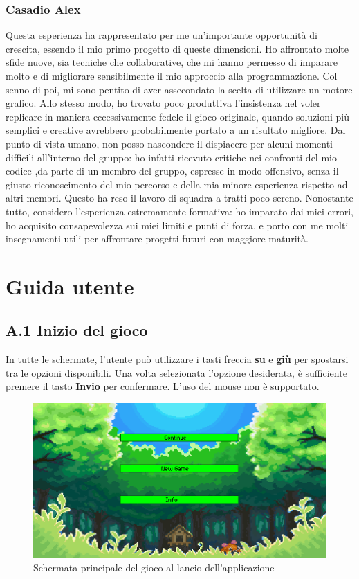 \documentclass[a4paper,12pt]{report}
\begin{document}
{{\subsection{Casadio Alex}
Questa esperienza ha rappresentato per me un’importante opportunità di crescita, essendo il mio primo progetto di queste dimensioni. Ho affrontato molte sfide nuove, sia tecniche che collaborative, che mi hanno permesso di imparare molto e di migliorare sensibilmente il mio approccio alla programmazione.
Col senno di poi, mi sono pentito di aver assecondato la scelta di utilizzare un motore grafico. Allo stesso modo, ho trovato poco produttiva l’insistenza nel voler replicare in maniera eccessivamente fedele il gioco originale, quando soluzioni più semplici e creative avrebbero probabilmente portato a un risultato migliore.
Dal punto di vista umano, non posso nascondere il dispiacere per alcuni momenti difficili all’interno del gruppo: ho infatti ricevuto critiche nei confronti del mio codice ,da parte di un membro del gruppo, espresse in modo offensivo, senza il giusto riconoscimento del mio percorso e della mia minore esperienza rispetto ad altri membri. Questo ha reso il lavoro di squadra a tratti poco sereno.
Nonostante tutto, considero l’esperienza estremamente formativa: ho imparato dai miei errori, ho acquisito consapevolezza sui miei limiti e punti di forza, e porto con me molti insegnamenti utili per affrontare progetti futuri con maggiore maturità.

 
\appendix
\chapter{Guida utente}

\section*{A.1 Inizio del gioco}
In tutte le schermate, l’utente può utilizzare i tasti freccia \textbf{su} e \textbf{giù} per spostarsi tra le opzioni disponibili.  
Una volta selezionata l’opzione desiderata, è sufficiente premere il tasto \textbf{Invio} per confermare.
L’uso del mouse non è supportato.
\begin{figure}[H]
  \centering
  \includegraphics[width=\textwidth]{immagini/scermataHome.png}
  \caption{Schermata principale del gioco al lancio dell'applicazione}
\end{figure}

}}
\end{document}
